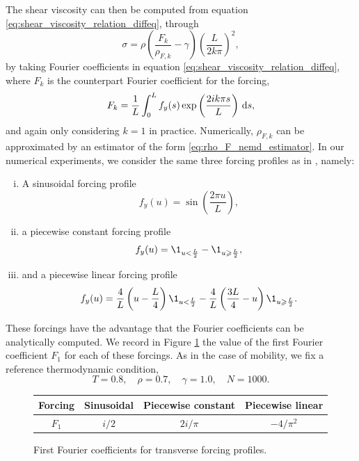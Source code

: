 The shear viscosity can then be computed from equation \eqref{eq:shear_viscosity_relation_diffeq}, through
\begin{equation}
    \label{eq:shear_viscosity_nemd_estimator}
    \sigma=\rho\left(\frac{F_k}{\rho_{F,k}}-\gamma\right)\left(\frac{L}{2k\pi}\right)^2,
\end{equation}
by taking Fourier coefficients in equation \eqref{eq:shear_viscosity_relation_diffeq},
where $F_k$ is the counterpart Fourier coefficient for the forcing,
\[F_k=\frac 1L\int_0^L f_y(s)\exp\left(\frac{2ik\pi s}L\right)\,\mathrm{d} s,\]
and again only considering $k=1$ in practice. Numerically, $\rho_{F,k}$ can be approximated by an estimator of the form \eqref{eq:rho_F_nemd_estimator}.
In our numerical experiments, we consider the same three forcing profiles as in \cite{JS12}, namely:
\begin{enumerate}[(i)]
    \item A sinusoidal forcing profile \[f_y(u)=\sin\left(\frac{2\pi u}{L}\right),\]
    \item a piecewise constant forcing profile \[f_y(u)=\1_{u<\frac{L}2}-\1_{u\geq \frac{L}2},\]
    \item and a piecewise linear forcing profile \[f_y(u)=\frac{4}{L}\left(u-\frac{L}4\right)\1_{u<\frac{L}2}-\frac{4}L\left(\frac{3L}4-u\right)\1_{u\geq \frac{L}2}.\]
\end{enumerate}
These forcings have the advantage that the Fourier coefficients can be analytically computed. We record in Figure \ref{tab:fourier_coefficients} the value of the first Fourier coefficient $F_1$ for each of these forcings.
As in the case of mobility, we fix a reference thermodynamic condition,
\begin{equation}
    \label{eq:reference_thermo_condition_sv}
    T=0.8,\quad \rho=0.7,\quad \gamma=1.0,\quad N=1000.
\end{equation}

\begin{figure}
    \begin{center}
        \begin{tabular}{ |c|c|c|c| }\hline
            Forcing & Sinusoidal & Piecewise constant & Piecewise linear \\
            \hline
            $F_1$ & $i/2$ & $2i/\pi$ & $-4/\pi^2$ \\
            \hline 
        \end{tabular}
        \caption{ \label{tab:fourier_coefficients}
            First Fourier coefficients for transverse forcing profiles.
          }
    \end{center}
\end{figure}

